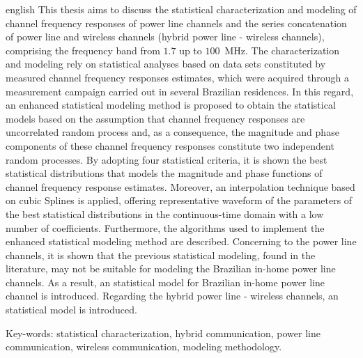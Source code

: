 \begin{resumo}[ABSTRACT]
	\begin{otherlanguage*}{english}		
This thesis aims to discuss the statistical characterization and modeling of channel frequency responses of power line channels and the series concatenation of power line and wireless channels (hybrid power line - wireless channels), comprising the frequency band from $1.7$ up to $100$~MHz. The characterization and modeling rely on statistical analyses based on data sets constituted by measured channel frequency responses estimates, which were acquired through a measurement campaign carried out in several Brazilian residences. In this regard, an enhanced statistical modeling method is proposed to obtain the statistical models based on the assumption that channel frequency responses are uncorrelated random process and, as a consequence, the magnitude and phase components of these channel frequency responses constitute two independent random processes. By adopting four statistical criteria, it is shown the best statistical distributions that models the magnitude and phase functions of channel frequency response estimates. Moreover, an interpolation technique based on cubic Splines is applied, offering representative waveform of the parameters of the best statistical distributions in the continuous-time domain with a low number of coefficients. Furthermore, the algorithms used to implement the enhanced statistical modeling method are described. Concerning to the power line channels, it is shown that the previous statistical modeling, found in the literature, may not be suitable for modeling the Brazilian in-home power line channels. As a result, an statistical model for Brazilian in-home power line channel is introduced. Regarding the hybrid power line - wireless channels, an statistical model is introduced. 
		
Key-words: statistical characterization, hybrid communication, power line communication, wireless communication, modeling methodology.		
	\end{otherlanguage*}
\end{resumo}


